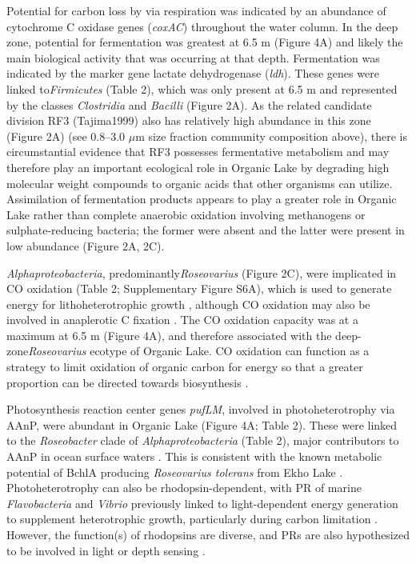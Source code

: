 Potential for carbon loss by via respiration was indicated by an abundance of cytochrome C oxidase genes (\emph{coxAC}) throughout the water column. 
In the deep zone, potential for fermentation was greatest at 6.5 m (Figure 4A) and likely the main biological activity that was occurring at that depth. 
Fermentation was indicated by the marker gene lactate dehydrogenase (\emph{ldh}).
These genes were linked to\emph{Firmicutes} (Table 2), which was only present at 6.5 m and represented by the classes \emph{Clostridia} and \emph{Bacilli} (Figure 2A). 
As the related candidate division RF3 (Tajima1999) also has relatively high abundance in this zone (Figure 2A)
(see 0.8--3.0 $\mu$m size fraction community composition above), %
there is circumstantial evidence that RF3 possesses fermentative metabolism and may therefore play an important ecological role in Organic Lake by degrading high molecular weight compounds to organic acids that other organisms can utilize. 
Assimilation of fermentation products appears to play a greater role in Organic Lake rather than complete anaerobic oxidation involving methanogens or sulphate-reducing bacteria; the former were absent and the latter were present in low abundance (Figure 2A, 2C). 

\emph{Alphaproteobacteria}, predominantly\emph{Roseovarius} (Figure 2C), were implicated in CO oxidation (Table 2; Supplementary Figure S6A), which is used to generate energy for lithoheterotrophic growth \cite{Moran2007}, although CO oxidation may also be involved in anaplerotic C fixation \cite{Moran2007}. 
The CO oxidation capacity was at a maximum at 6.5 m (Figure 4A), and therefore associated with the deep-zone\emph{Roseovarius} ecotype of Organic Lake. 
CO oxidation can function as a strategy to limit oxidation of organic carbon for energy so that a greater proportion can be directed towards biosynthesis \cite{Moran2007}.

Photosynthesis reaction center genes \emph{pufLM}, involved in photoheterotrophy via \ac{AAnP}, were abundant in Organic Lake (Figure 4A; Table 2). 
These were linked to the \emph{Roseobacter} clade of \emph{Alphaproteobacteria} (Table 2), major contributors to \ac{AAnP} in ocean surface waters \cite{Beja2002, Moran2007}. 
This is consistent with the known metabolic potential of \ac{BchlA} producing \emph{Roseovarius tolerans} from Ekho Lake \cite{Labrenz1999}. 
Photoheterotrophy can also be rhodopsin-dependent, with \ac{PR} of marine \emph{Flavobacteria} and \emph{Vibrio} previously linked to light-dependent energy generation to supplement heterotrophic growth, particularly during carbon limitation \cite{Gomez-Consarnau2007, Gomez-Consarnau2010}. 
However, the function(s) of rhodopsins are diverse, and \acp{PR} are also hypothesized to be involved in light or depth sensing \cite{Fuhrman2008}. 

